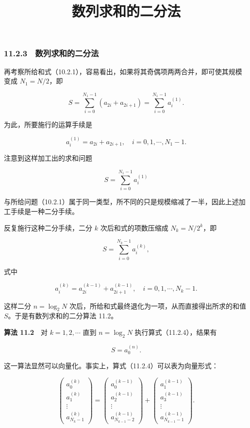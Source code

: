 \documentclass[
  10pt,
  fontset=fandol]{ctexart}
\title{数列求和的二分法}
\author{}
\date{}
\begin{document}
\maketitle

\subsubsection{11.2.3　数列求和的二分法}\label{ux6570ux5217ux6c42ux548cux7684ux4e8cux5206ux6cd5}

再考察所给和式（10.2.1），容易看出，如果将其奇偶项两两合并，即可使其规模变成 \(N_1=N/2\)，即

\[
S=\sum_{i=0}^{N_1-1}(a_{2i}+a_{2i+1})=\sum_{i=0}^{N_1-1}a_i^{(1)}.
\]

为此，所要施行的运算手续是

\[
a_i^{(1)}=a_{2i}+a_{2i+1},\quad i=0,1,\cdots,N_1-1.
\]

注意到这样加工出的求和问题

\[
S=\sum_{i=0}^{N_1-1}a_i^{(1)}
\]

与所给问题（10.2.1）属于同一类型，所不同的只是规模缩减了一半，因此上述加工手续是一种二分手续。

反复施行这种二分手续，二分 \(k\) 次后和式的项数压缩成 \(N_k=N/2^k\)，即

\[
S=\sum_{i=0}^{N_k-1}a_i^{(k)},
\]

式中

\[
a_i^{(k)}=a_{2i}^{(k-1)}+a_{2i+1}^{(k-1)},\quad i=0,1,\cdots,N_k-1.
\tag{11.2.4}
\]

这样二分 \(n=\log_2 N\) 次后，所给和式最终退化为一项，从而直接得出所求的和值 \(S\)。于是有数列求和的二分算法 11.2。

\textbf{算法 11.2}　对 \(k=1,2,\cdots\) 直到 \(n=\log_2 N\) 执行算式（11.2.4），结果有

\[
S=a_0^{(n)}.
\]

这一算法显然可以向量化。事实上，算式（11.2.4）可以表为向量形式：

\[
\begin{pmatrix}
a_0^{(k)}\\
a_1^{(k)}\\
\vdots\\
a_{N_k-1}^{(k)}
\end{pmatrix}
=
\begin{pmatrix}
a_0^{(k-1)}\\
a_2^{(k-1)}\\
\vdots\\
a_{N_{k-1}-2}^{(k-1)}
\end{pmatrix}
+
\begin{pmatrix}
a_1^{(k-1)}\\
a_3^{(k-1)}\\
\vdots\\
a_{N_{k-1}-1}^{(k-1)}
\end{pmatrix}.
\]
\end{document}
